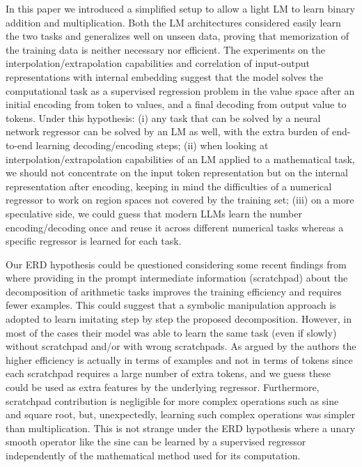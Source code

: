 \documentclass[final,1p,times,authoryear]{elsarticle}
\begin{document}
In this paper we introduced a simplified setup to allow a light LM to learn binary addition and multiplication. Both the LM architectures considered easily learn the two tasks and generalizes well on unseen data, proving that memorization of the training data is neither necessary nor efficient. The experiments on the interpolation/extrapolation capabilities and correlation of input-output representations with internal embedding suggest that the model solves the computational task as a supervised regression problem in the value space after an initial encoding from token to values, and a final decoding from output value to tokens. Under this hypothesis: (i) any task that can be solved by a neural network regressor can be solved by an LM as well, with the extra burden of end-to-end learning decoding/encoding steps; (ii) when looking at interpolation/extrapolation capabilities of an LM applied to a mathematical task, we should not concentrate on the input token representation but on the internal representation after encoding, keeping in mind the difficulties of a numerical regressor to work on region spaces not covered by the training set; (iii) on a more speculative side, we could guess that modern LLMs learn the number encoding/decoding once and reuse it across different numerical tasks whereas a specific regressor is learned for each task.

Our ERD hypothesis could be questioned considering some recent findings from \citet{Lee2023} where providing in the prompt intermediate information (scratchpad) about the decomposition of arithmetic tasks improves the training efficiency and requires fewer examples. This could suggest that a symbolic manipulation approach is adopted to learn imitating step by step the proposed decomposition. However, in most of the cases their model was able to learn the same task (even if slowly) without scratchpad and/or with wrong scratchpads. As argued by the authors the higher efficiency is actually in terms of examples and not in terms of tokens since each scratchpad requires a large number of extra tokens, and we guess these could be used as extra features by the underlying regressor. Furthermore, scratchpad contribution is negligible for more complex operations such as sine and square root, but, unexpectedly, learning such complex operations was simpler than multiplication. This is not strange under the ERD hypothesis where a unary smooth operator like the sine can be learned by a supervised regressor independently of the mathematical method used for its computation.
\end{document}
